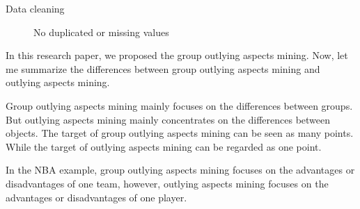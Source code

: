 \documentclass[
 size=14pt,
 paper=smartboard,  %
 mode=present, 		%
 display=slides, 	%
 style=tuliplab,  	%
 pauseslide,
 fleqn,leqno]{powerdot}
\begin{document}
\begin{slide}{Data cleaning}
\begin{figure}
  \caption{No duplicated or missing values}
\end{figure}
%

\begin{note}
In this research paper,
we proposed the group outlying aspects mining.
Now,
let me summarize the differences between group outlying aspects mining and outlying aspects mining.

Group outlying aspects mining mainly focuses on the differences between groups.
But outlying aspects mining mainly concentrates on the differences between objects.
The target of group outlying aspects mining can be seen as many points.
While the target of outlying aspects mining can be regarded as one point.

In the NBA example,
group outlying aspects mining focuses on the advantages
or disadvantages of one team,
however,
outlying aspects mining focuses on the advantages or disadvantages of one player.
\end{note}

\end{slide}
\end{document}
